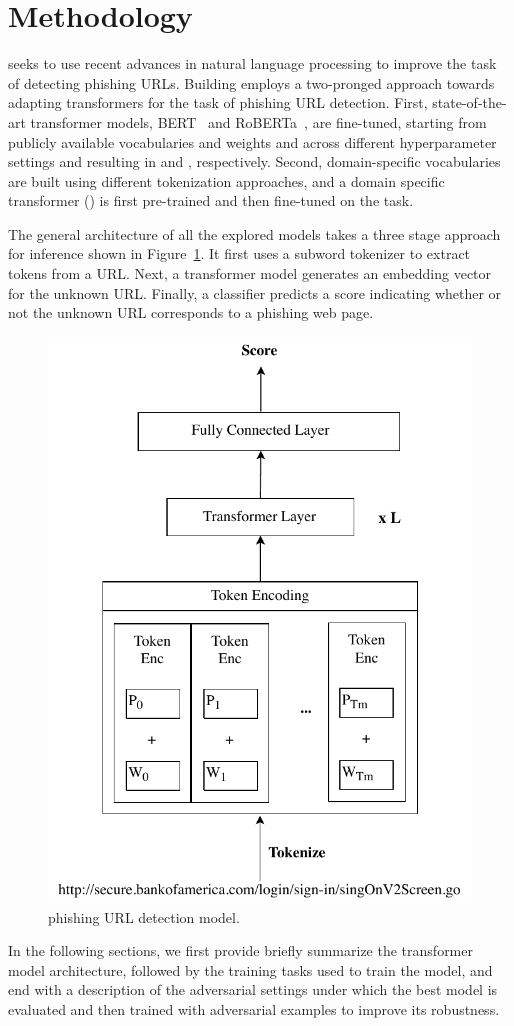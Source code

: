\section{Methodology}
\label{sec:urltran:method}
%
\URLTranSys seeks to use recent advances in natural language processing to improve the task of detecting phishing URLs.
Building \URLTranSys employs a two-pronged approach towards adapting transformers for the task of phishing URL detection.
First, state-of-the-art transformer models, BERT~\citep{devlin2019bert} and  RoBERTa~\citep{liu2019roberta}, are fine-tuned, starting from publicly available vocabularies and weights and across different hyperparameter settings and resulting in \URLTranSysb and \URLTranSysr, respectively.
Second, domain-specific vocabularies are built using different tokenization approaches, and a domain specific transformer (\URLTranSysc) is first pre-trained and then fine-tuned on the task. 

 The general architecture of all the explored models takes a three stage approach for inference shown in Figure~\ref{fig:urltran:transformer}. It first uses a subword tokenizer to extract tokens from a URL.
Next, a  transformer model generates an embedding vector for the unknown URL.
Finally, a classifier predicts a score indicating whether or not the unknown URL corresponds to a phishing web page.
\begin{figure}
	\centering
	\includegraphics[width=0.4\linewidth]{urltran/figures/TransformerModel}
	\caption{\URLTranSys phishing URL detection model.}
	\label{fig:urltran:transformer}
\end{figure}
In the following sections, we first provide briefly summarize the transformer model architecture, followed by the training tasks used to train the model, and end with a description of the adversarial settings under which the best \URLTranSys model is evaluated and then trained with adversarial examples to improve its robustness.

